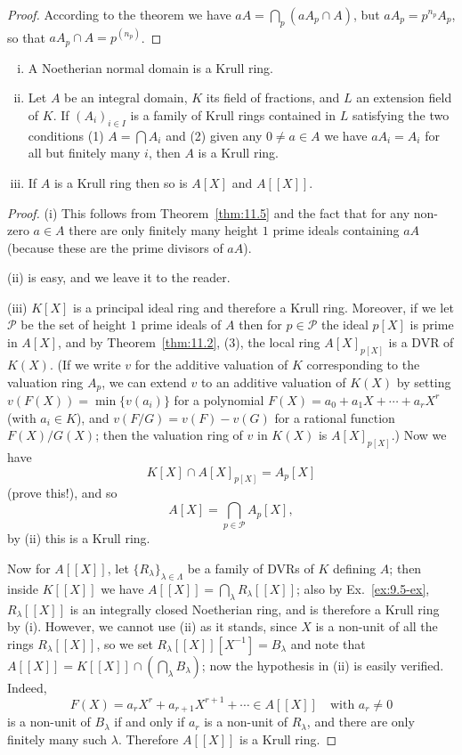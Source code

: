 \begin{proof}
According to the theorem we have $aA = \bigcap_p (aA_p \cap A)$,
but $aA_p = p^{n_p}A_p$, so that $aA_p \cap A = p^{(n_p)}$.
\end{proof}

\begin{theorem}\label{thm:12.4}
\begin{enumerate}[(i)]
  \item A Noetherian normal domain is a Krull ring.
  \item Let $A$ be an integral domain, $K$ its field of fractions, and $L$ an extension
        field of $K$. If $(A_i)_{i \in I}$ is a family of Krull rings contained in $L$ satisfying
        the two conditions (1) $A = \bigcap A_i$ and (2) given any $0 \neq a \in A$ we have
        $aA_i = A_i$ for all but finitely many $i$, then $A$ is a Krull ring.
  \item If $A$ is a Krull ring then so is $A[X]$ and $A[[X]]$.
\end{enumerate}
\end{theorem}

\begin{proof}
(i) This follows from Theorem~\ref{thm:11.5} and the fact that for any non-
zero $a \in A$ there are only finitely many height $1$ prime ideals containing $aA$
(because these are the prime divisors of $aA$).

(ii) is easy, and we leave it to the reader.

(iii) $K[X]$ is a principal ideal ring and therefore a Krull ring. Moreover,
if we let $\mathcal{P}$ be the set of height $1$ prime ideals of $A$ then for $p \in \mathcal{P}$
the ideal $p[X]$ is prime in $A[X]$, and by Theorem~\ref{thm:11.2}, (3), the local ring
$A[X]_{p[X]}$ is a DVR of $K(X)$. (If we write $v$ for the additive valuation of $K$
corresponding to the valuation ring $A_p$, we can extend $v$ to an additive
valuation of $K(X)$ by setting $v(F(X)) = \min\{v(a_i)\}$ for a polynomial
$F(X) = a_0 + a_1X + \cdots + a_rX^r$ (with $a_i \in K$),
and $v(F/G) = v(F) - v(G)$ for a rational function $F(X)/G(X)$; then the
valuation ring of $v$ in $K(X)$ is $A[X]_{p[X]}$.) Now we have
\[
  K[X] \cap A[X]_{p[X]} = A_p[X]
\]
(prove this!), and so
\[
  A[X] = \bigcap_{p \in \mathcal{P}} A_p[X],
\]
by (ii) this is a Krull ring.

Now for $A[[X]]$, let $\{R_\lambda\}_{\lambda \in \Lambda}$ be a family of DVRs of $K$ defining $A$; then
inside $K[[X]]$ we have $A[[X]] = \bigcap_\lambda R_\lambda[[X]]$; also by Ex.~\ref{ex:9.5-ex}, $R_\lambda[[X]]$ is an
integrally closed Noetherian ring, and is therefore a Krull ring by (i).
However, we cannot use (ii) as it stands, since $X$ is a non-unit of all the rings
$R_\lambda[[X]]$, so we set $R_\lambda[[X]][X^{-1}] = B_\lambda$ and note that $A[[X]] = K[[X]] \cap
(\bigcap_\lambda B_\lambda)$; now the hypothesis in (ii) is easily verified. Indeed,
\[
  F(X) = a_rX^r + a_{r+1}X^{r+1} + \cdots \in A[[X]] \quad \text{with } a_r \neq 0
\]
is a non-unit of $B_\lambda$ if and only if $a_r$ is a non-unit of $R_\lambda$, and there are only
finitely many such $\lambda$. Therefore $A[[X]]$ is a Krull ring.
\end{proof}

